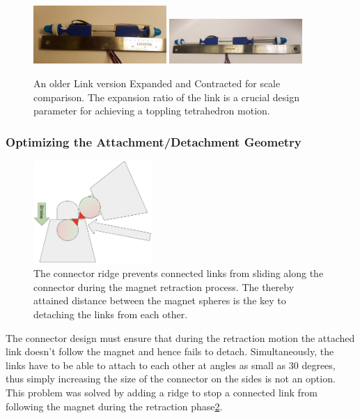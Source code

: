 \documentclass[letterpaper, 10 pt, conference]{ieeeconf}  %
\begin{document}
\begin{figure}
\centering
\includegraphics[width=0.45\textwidth]{media/V3_2contracted.jpg}
\includegraphics[width=0.45\textwidth]{media/V3_2expanded.jpg}
    \caption{\label{v3expansion}An older Link version Expanded and Contracted for scale comparison. The expansion ratio of the link is a crucial design parameter for achieving a toppling tetrahedron motion.}
\end{figure}

\subsubsection{Optimizing the Attachment/Detachment Geometry}
\begin{figure}
\centering
\includegraphics[width=0.4\textwidth]{media/ConnectorRidge.png}
   \caption{\label{fig_connectorRidge} The connector ridge prevents connected links from sliding along the connector during the magnet retraction process. The thereby attained distance between the magnet spheres is the key to detaching the links from each other.}
\end{figure}

The connector design must ensure that during the retraction motion the attached link doesn't follow the magnet and hence fails to detach. Simultaneously, the links have to be able to attach to each other at angles as small as 30 degrees, thus simply increasing the size of the connector on the sides is not an option. This problem was solved by adding a ridge to stop a connected link from following the magnet during the retraction phase\ref{fig_connectorRidge}.
\end{document}

